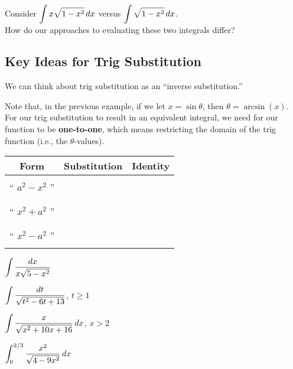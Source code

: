 \documentclass[12pt]{article}
\begin{document}
\newpage

\Example Consider $\displaystyle\int x\sqrt{1-x^2}\,dx$ versus $\displaystyle\int\sqrt{1-x^2}\,dx$. \\

How do our approaches to evaluating these two integrals differ?

\vfill

\subsection*{Key Ideas for Trig Substitution}

We can think about trig substitution as an ``inverse substitution.''

\vspace{15mm}

Note that, in the previous example, if we let $x=\sin\theta$, then $\theta=\arcsin(x)$. For our trig substitution to result in an equivalent integral, we need for our function to be \textbf{one-to-one}, which means restricting the domain of the trig function (i.e., the $\theta$-values).

\begin{center}
\renewcommand{\arraystretch}{1.7}
\begin{tabular}{|c|c|c|}
\hline
\textbf{Form} & \textbf{Substitution} & \textbf{Identity}\\
\hline
& & \\
`` $a^2-x^2$ '' & \hspace{60mm} & \hspace{60mm} \\
& & \\
\hline
& & \\
`` $x^2+a^2$ '' & & \\
& & \\
\hline
& & \\
`` $x^2-a^2$ '' & & \\
& & \\
\hline
\end{tabular}
\end{center}

\newpage

\Example $\displaystyle\int\frac{dx}{x\sqrt{5-x^2}}$

\newpage

\Example $\displaystyle\int\frac{dt}{\sqrt{t^2-6t+13}}$, $t\geq 1 $

\newpage

\Example $\displaystyle\int\frac{x}{\sqrt{x^2+10x+16}}\,dx$, $x>2$

\newpage

\Example $\displaystyle\int_0^{2/3}\frac{x^2}{\sqrt{4-9x^2}}\,dx$
\end{document}
